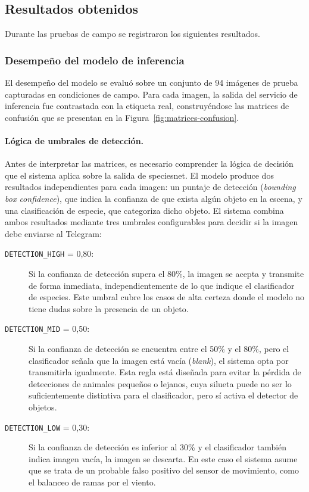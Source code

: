 \documentclass[a4paper, 12pt]{report}
\begin{document}
\newpage
\subsection{Resultados obtenidos}

Durante las pruebas de campo se registraron los siguientes resultados.

\subsubsection{Desempeño del modelo de inferencia}

El desempeño del modelo se evaluó sobre un conjunto de 94 imágenes de prueba
capturadas en condiciones de campo. Para cada imagen, la salida
del servicio de inferencia fue contrastada con la etiqueta real, construyéndose
las matrices de confusión que se presentan en la Figura~\ref{fig:matrices-confusion}.

\paragraph{Lógica de umbrales de detección.}
Antes de interpretar las matrices, es necesario comprender la lógica de decisión
que el sistema aplica sobre la salida de \gls{speciesnet}. El modelo produce dos
resultados independientes para cada imagen: un puntaje de detección
(\textit{bounding box confidence}), que indica la confianza de que exista algún
objeto en la escena, y una clasificación de especie, que categoriza dicho
objeto. El sistema combina ambos resultados mediante tres umbrales configurables
para decidir si la imagen debe enviarse al Telegram:

\begin{description}
  \item[\texttt{DETECTION\_HIGH} = 0{,}80:]
    Si la confianza de detección supera el 80\%, la imagen se acepta y transmite
    de forma inmediata, independientemente de lo que indique el clasificador de
    especies. Este umbral cubre los casos de alta certeza donde el modelo no tiene
    dudas sobre la presencia de un objeto.

  \item[\texttt{DETECTION\_MID} = 0{,}50:]
    Si la confianza de detección se encuentra entre el 50\% y el 80\%, pero el
    clasificador señala que la imagen está vacía (\textit{blank}), el sistema opta
    por transmitirla igualmente. Esta regla está diseñada para evitar la pérdida
    de detecciones de animales pequeños o lejanos, cuya silueta puede no ser lo
    suficientemente distintiva para el clasificador, pero sí activa el detector
    de objetos.

    \item[\texttt{DETECTION\_LOW} = 0{,}30:]
    Si la confianza de detección es inferior al 30\% y el clasificador también
    indica imagen vacía, la imagen se descarta. En este caso el sistema asume que
    se trata de un probable falso positivo del sensor de movimiento, como el
    balanceo de ramas por el viento.
\end{description}
\end{document}

